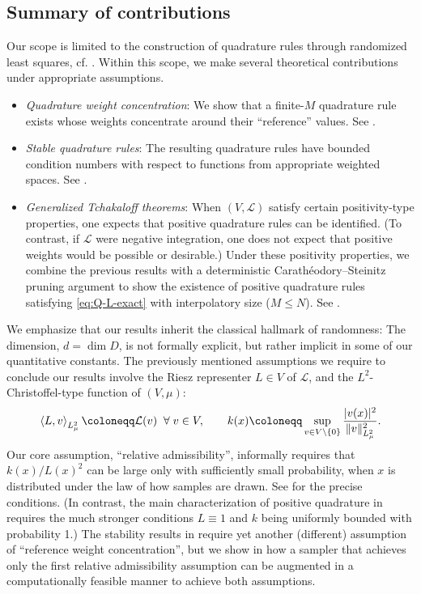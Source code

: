 \documentclass[10pt,dvipsnames]{amsart}
\begin{document}
\subsection{Summary of contributions}
Our scope is limited to the construction of quadrature rules through randomized
least squares, cf. .  Within this scope, we make several
theoretical contributions under appropriate assumptions.
\begin{itemize}
  \item \textit{Quadrature weight concentration}: We show that a finite-$M$ quadrature rule exists whose weights concentrate around their ``reference'' values. See .
  \item \textit{Stable quadrature rules}: The resulting quadrature rules have bounded condition numbers with respect to functions from appropriate weighted spaces. See .
  \item \textit{Generalized Tchakaloff theorems}: When $(V,\mathcal{L})$ satisfy certain positivity-type properties, one expects that positive quadrature rules can be identified. (To contrast, if $\mathcal{L}$ were negative integration, one does not expect that positive weights would be possible or desirable.) Under these positivity properties, we combine the previous results with a deterministic Carath\'eodory--Steinitz pruning
argument to show the existence of positive quadrature rules satisfying \eqref{eq:Q-L-exact} with interpolatory size ($M \leq N$). See .
\end{itemize}
We emphasize that our results inherit the classical hallmark of randomness: The
dimension, $d = \dim D$, is not formally explicit, but rather implicit in some of
our quantitative constants. The previously mentioned assumptions we require to
conclude our results involve the Riesz representer $L \in V$ of $\mathcal{L}$,
and the $L^2$-Christoffel-type function of
$(V,\mu)$:
\begin{align*}
  \left\langle L, v\right\rangle_{L^2_\mu} \coloneqq \mathcal{L}(v) \;\;\forall\; v \in V, \hskip 20pt
  k(x) \coloneqq \sup_{v \in V\backslash\{0\}} \frac{|v(x)|^2}{\|v\|_{L^2_\mu}^2}.
\end{align*}
Our core assumption, ``relative admissibility'', informally requires that
$k(x)/L(x)^2$ can be large only with sufficiently small probability, when $x$
is distributed under the law of how samples are drawn. See
 for the precise conditions. (In contrast, the main
characterization of positive quadrature in \cite{migliorati2022stable} requires
the much stronger conditions $L \equiv 1$ and $k$ being uniformly bounded with
probability 1.) The stability results in 
require yet another (different) assumption of ``reference weight
concentration'', but we show in  how a sampler that
achieves only the first relative admissibility assumption can be augmented in a
computationally feasible manner to achieve both assumptions.
\end{document}
